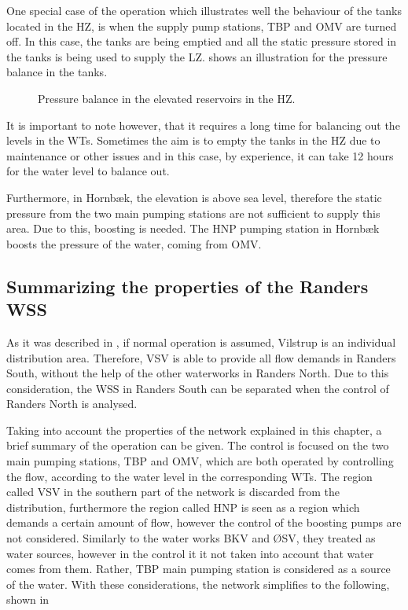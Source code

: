 One special case of the operation which illustrates well the behaviour of the tanks located in the HZ, is when the supply pump stations, TBP and OMV are turned off. In this case, the tanks are being emptied and all the static pressure stored in the tanks is being used to supply the LZ.  shows an illustration for the pressure balance in the tanks.

\begin{figure}[H]
\centering

\caption{Pressure balance in the elevated reservoirs in the HZ. }
\label{fig:pressure_balance_Randers}
\end{figure}

\vspace{-3mm}
It is important to note however, that it requires a long time for balancing out the levels in the WTs. Sometimes the aim is to empty the tanks in the HZ due to maintenance or other issues and in this case, by experience, it can take 12 hours for the water level to balance out.  

Furthermore, in Hornbæk, the elevation is above sea level, therefore the static pressure from the two main pumping stations are not sufficient to supply this area. Due to this, boosting is needed. The HNP pumping station in Hornbæk boosts the pressure of the water, coming from OMV. 

\subsection{Summarizing the properties of the Randers WSS}
\label{Randers_wss_summary}

As it was described in , if normal operation is assumed, Vilstrup is an individual distribution area. Therefore, VSV is able to provide all flow demands in Randers South, without the help of the other waterworks in Randers North. Due to this consideration, the WSS in Randers South can be separated when the control of Randers North is analysed. 

Taking into account the properties of the network explained in this chapter, a brief summary of the operation can be given. The control is focused on the two main pumping stations, TBP and OMV, which are both operated by controlling the flow, according to the water level in the corresponding WTs. The region called VSV in the southern part of the network is discarded from the distribution, furthermore the region called HNP is seen as a region which demands a certain amount of flow, however the control of the boosting pumps are not considered. Similarly to the water works BKV and ØSV, they treated as water sources, however in the control it it not taken into account that water comes from them. Rather, TBP main pumping station is considered as a source of the water. With these considerations, the network simplifies to the following, shown in 

